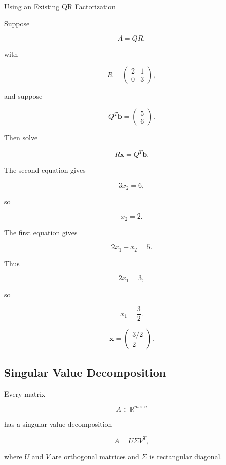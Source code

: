\begin{workedexamplebox}{Using an Existing QR Factorization}

Suppose

\[
A
=
QR,
\]

with

\[
R
=
\begin{pmatrix}
2&1\\
0&3
\end{pmatrix},
\]

and suppose

\[
Q^T\mathbf{b}
=
\begin{pmatrix}
5\\
6
\end{pmatrix}.
\]

Then solve

\[
R\mathbf{x}
=
Q^T\mathbf{b}.
\]

The second equation gives

\[
3x_2=6,
\]

so

\[
x_2=2.
\]

The first equation gives

\[
2x_1+x_2=5.
\]

Thus

\[
2x_1=3,
\]

so

\[
x_1=\frac32.
\]

\begin{answerbox}
\[
\boxed{
\mathbf{x}
=
\begin{pmatrix}
3/2\\
2
\end{pmatrix}.
}
\]
\end{answerbox}

\end{workedexamplebox}

\subsection{Singular Value Decomposition}
\label{subsec:singular-value-decomposition}

Every matrix

\[
A\in\mathbb{R}^{m\times n}
\]

has a singular value decomposition

\[
\boxed{
A
=
U\Sigma V^T,
}
\]

where \(U\) and \(V\) are orthogonal matrices and \(\Sigma\) is rectangular
diagonal.

